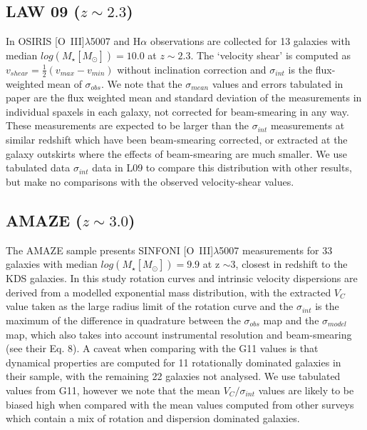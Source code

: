 \documentclass[fleqn,usenatbib]{mn2e}
\begin{document}
\subsection{LAW 09 ($z\sim2.3$)}\label{subsec:law_09}
In \cite[L09]{Law2009} OSIRIS [O~{\sc III}]$\lambda$5007 and H$\alpha$ observations are collected for 13 galaxies with median $log(M_{\star}[M_{\odot}])=10.0$ at $z\sim2.3$.
The `velocity shear' is computed as $v_{shear} = \frac{1}{2}(v_{max} - v_{min})$ without inclination correction and $\sigma_{int}$ is the flux-weighted mean of $\sigma_{obs}$.
We note that the $\sigma_{mean}$ values and errors tabulated in \cite{Law2009} paper are the flux weighted mean and standard deviation of the measurements in individual spaxels in each galaxy, not corrected for beam-smearing in any way.
These measurements are expected to be larger than the $\sigma_{int}$ measurements at similar redshift which have been beam-smearing corrected, or extracted at the galaxy outskirts where the effects of beam-smearing are much smaller.
We use tabulated data $\sigma_{int}$ data in L09 to compare this distribution with other results, but make no comparisons with the observed velocity-shear values.

\subsection{AMAZE ($z\sim3.0$)}\label{subsec:AMAZE}
The AMAZE sample \cite[G11]{Gnerucci2011} presents SINFONI [O~{\sc III}]$\lambda$5007 measurements for 33 galaxies with median $log(M_{\star}[M_{\odot}])=9.9$ at z $\sim 3$, closest in redshift to the KDS galaxies.
In this study rotation curves and intrinsic velocity dispersions are derived from a modelled exponential mass distribution, with the extracted $V_{C}$ value taken as the large radius limit of the rotation curve and the $\sigma_{int}$ is the maximum of the difference in quadrature between the $\sigma_{obs}$ map and the $\sigma_{model}$ map, which also takes into account instrumental resolution and beam-smearing (see their Eq. 8).
A caveat when comparing with the G11 values is that dynamical properties are computed for 11 rotationally dominated galaxies in their sample, with the remaining 22 galaxies not analysed.
We use tabulated values from G11, however we note that the mean $V_{C}/\sigma_{int}$ values are likely to be biased high when compared with the mean values computed from other surveys which contain a mix of rotation and dispersion dominated galaxies. \\
\end{document}
